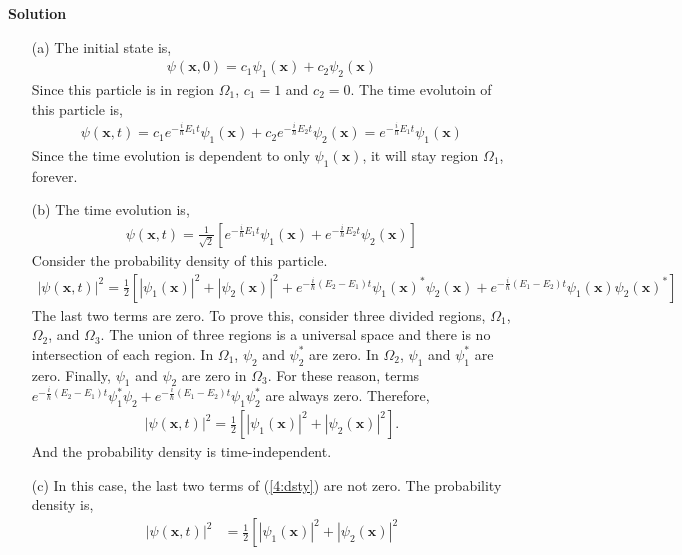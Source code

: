 \documentclass[floatfix,nofootinbib,superscriptaddress,fleqn]{revtex4}
\begin{document}
\noindent \textbf{Solution}
\begin{itemize}
\item[(a)] The initial state is,
  \begin{align*}
    \psi(\bm{x},0) = c_1\psi_1(\bm{x})+c_2\psi_2(\bm{x})
  \end{align*} 
  Since this particle is in region $\Omega_1$, $c_1=1$ and $c_2=0$. 
  The time evolutoin of this particle is,
  \begin{align*}
    \psi(\bm{x},t) = c_1e^{-\frac{i}{\hbar}E_1t}\psi_1(\bm{x})
    +c_2e^{-\frac{i}{\hbar}E_2t}\psi_2(\bm{x}) 
    = e^{-\frac{i}{\hbar}E_1t}\psi_1(\bm{x})
  \end{align*}
  Since the time evolution is dependent to only $\psi_1(\bm{x})$, 
  it will stay region $\Omega_1$, 
  forever.
\item[(b)]
  The time evolution is,
  \begin{align*}
    \psi(\bm{x},t) = \frac{1}{\sqrt{2}}\left[
      e^{-\frac{i}{\hbar}E_1t}\psi_1(\bm{x})
    +e^{-\frac{i}{\hbar}E_2t}\psi_2(\bm{x})\right]
  \end{align*}
  Consider the probability density of this particle.
  \begin{align}\label{4:dsty}
    |\psi(\bm{x},t)|^2 = \frac{1}{2}\left[|\psi_1(\bm{x})|^2 
    +|\psi_2(\bm{x})|^2
    +e^{-\frac{i}{\hbar}(E_2-E_1)t}\psi_1(\bm{x})^*\psi_2(\bm{x})
    +e^{-\frac{i}{\hbar}(E_1-E_2)t}\psi_1(\bm{x})\psi_2(\bm{x})^*\right]
  \end{align}
  The last two terms are zero. To prove this, consider three divided regions, 
  $\Omega_1$, $\Omega_2$, and $\Omega_3$. The union of three regions is a
  universal space and there is no intersection of each region. In $\Omega_1$,
  $\psi_2$ and $\psi_2^*$ are zero. In $\Omega_2$, $\psi_1$ and $\psi_1^*$
  are zero. Finally, $\psi_1$ and $\psi_2$ are zero in $\Omega_3$.
  For these reason, terms $e^{-\frac{i}{\hbar}(E_2-E_1)t}\psi_1^*\psi_2
    +e^{-\frac{i}{\hbar}(E_1-E_2)t}\psi_1\psi_2^*$ are always zero.
  Therefore, 
  \begin{align}
    |\psi(\bm{x},t)|^2=\frac{1}{2}\left[|\psi_1(\bm{x})|^2
  +|\psi_2(\bm{x})|^2 \right]. 
  \end{align}
  And the probability density is time-independent.
\item[(c)]In this case, the last two terms of (\ref{4:dsty}) are not zero. 
The probability density is,
  \begin{align*}
    |\psi(\bm{x},t)|^2&= \frac{1}{2}\left[|\psi_1(\bm{x})|^2 
    +|\psi_2(\bm{x})|^2

\end{align*}
\end{itemize}
\end{document}
